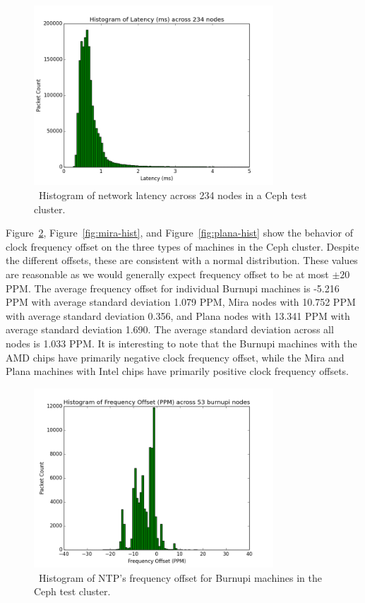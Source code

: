 \begin{figure}[h]
  \centering
  \caption{~Histogram of network latency across 234 nodes in a Ceph test cluster.} 
  \label{fig:latency-hist}
  \includegraphics[width=0.8\textwidth]{latency-hist.png}
\end{figure}

Figure~\ref{fig:burnupi-hist}, Figure~\ref{fig:mira-hist},
and Figure~\ref{fig:plana-hist} show the behavior of clock frequency offset
on the three types of machines in the Ceph cluster. Despite the different offsets, 
these are consistent with a normal distribution. These values are reasonable 
as we would generally expect frequency offset to be at most $\pm 20$ PPM. 
The average frequency offset for individual Burnupi machines is -5.216 PPM with 
average standard deviation 1.079 PPM, Mira nodes with 10.752 PPM with average
standard deviation 0.356, and Plana nodes with 13.341 PPM with average standard deviation 1.690. The average standard deviation across all nodes is
1.033 PPM. It is interesting to note that the Burnupi machines with 
the AMD chips have primarily negative clock frequency offset, while the 
Mira and Plana machines with Intel chips have primarily positive 
clock frequency offsets.

\begin{figure}[h]
  \centering
  \caption{~Histogram of NTP's frequency offset for Burnupi machines in the Ceph test cluster.}
  \label{fig:burnupi-hist}
  \includegraphics[width=0.8\textwidth]{burnupi-freq-offset.png}
\end{figure}

